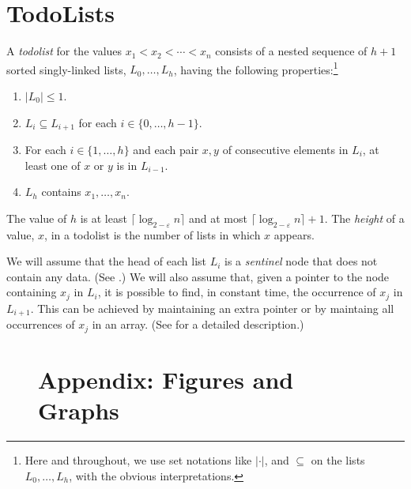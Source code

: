 \documentclass{patmorin}
\begin{document}
\section{TodoLists}

A \emph{todolist} for the values $x_1<x_2<\cdots<x_n$ consists of a
nested sequence of $h+1$ sorted singly-linked lists, $L_0,\ldots,L_h$,
having the following properties:\footnote{Here and throughout, we use set
notations like $|\cdot|$, and $\subseteq$ on the lists $L_0,\ldots,L_h$,
with the obvious interpretations.}

\begin{enumerate}
  \item $|L_0| \le 1$.
  \item $L_i\subseteq L_{i+1}$ for each $i\in\{0,\ldots,h-1\}$.
  \item For each $i\in\{1,\ldots,h\}$ and each pair $x,y$ of consecutive
        elements in $L_i$, at least one of $x$ or $y$ is in $L_{i-1}$.
  \item $L_h$ contains $x_1,\ldots,x_n$.
\end{enumerate}

The value of $h$ is at least $\lceil \log_{2-\varepsilon} n\rceil$ and
at most $\lceil \log_{2-\varepsilon} n\rceil+1$.  The \emph{height} of
a value, $x$, in a todolist is the number of lists in which $x$ appears.

We will assume that the head of each list $L_i$ is a \emph{sentinel} node that does not contain any data. (See .)  We will also
assume that, given a pointer to the node containing $x_j$ in $L_i$, it is
possible to find, in constant time, the occurrence of $x_j$ in $L_{i+1}$.
This can be achieved by maintaining an extra pointer or by maintaing
all occurrences of $x_j$ in an array. (See  for
a detailed description.)

\begin{figure}
\section*{Appendix: Figures and Graphs}
\end{figure}
\end{document}
